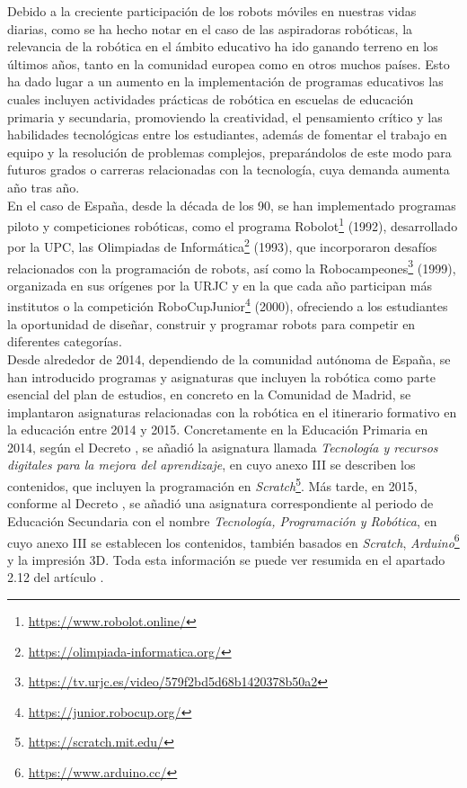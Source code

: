 Debido a la creciente participación de los robots móviles en nuestras vidas
diarias, como se ha hecho notar en el caso de las aspiradoras robóticas, la
relevancia de la robótica en el ámbito educativo ha ido ganando terreno en los
últimos años, tanto en la comunidad europea como en otros muchos países.
Esto ha dado lugar a un aumento en la implementación de programas educativos las
cuales incluyen actividades prácticas de robótica en escuelas de educación
primaria y secundaria, promoviendo la creatividad, el pensamiento crítico y las
habilidades tecnológicas entre los estudiantes, además de fomentar el trabajo en
equipo y la resolución de problemas complejos, preparándolos de este modo para
futuros grados o carreras relacionadas con la tecnología, cuya demanda aumenta
año tras año.
\\

En el caso de España, desde la década de los 90, se han implementado programas
piloto y competiciones robóticas, como el programa Robolot\footnote{
\href{https://www.robolot.online/}{https://www.robolot.online/}} (1992),
desarrollado por la UPC, las Olimpiadas de Informática\footnote{
\href{https://olimpiada-informatica.org/}{https://olimpiada-informatica.org/}}
(1993), que incorporaron desafíos relacionados con la programación de robots,
así como la Robocampeones\footnote{
\href{https://tv.urjc.es/video/579f2bd5d68b1420378b50a2}{https://tv.urjc.es/video/579f2bd5d68b1420378b50a2}}
(1999), organizada en sus orígenes por la URJC y en la que cada año participan
más institutos o la competición RoboCupJunior\footnote{
\href{https://junior.robocup.org/}{https://junior.robocup.org/}} (2000),
ofreciendo a los estudiantes la oportunidad de diseñar, construir y programar
robots para competir en diferentes categorías.
\\

Desde alrededor de 2014, dependiendo de la comunidad autónoma de España, se han
introducido programas y asignaturas que incluyen la robótica como parte esencial
del plan de estudios, en concreto en la Comunidad de Madrid, se implantaron
asignaturas relacionadas con la robótica en el itinerario formativo en la
educación entre 2014 y 2015.
Concretamente en la Educación Primaria en 2014, según el Decreto
\cite{Decreto2014}, se añadió la asignatura llamada \textit{Tecnología y
recursos digitales para la mejora del aprendizaje}, en cuyo anexo III se
describen los contenidos, que incluyen la programación en
\textit{Scratch}\footnote{
\href{https://scratch.mit.edu/}{https://scratch.mit.edu/}}.
Más tarde, en 2015, conforme al Decreto \cite{Decreto2015}, se añadió una
asignatura correspondiente al periodo de Educación Secundaria con el nombre
\textit{Tecnología, Programación y Robótica}, en cuyo anexo III se establecen
los contenidos, también basados en \textit{Scratch}, \textit{Arduino}\footnote{
\href{https://www.arduino.cc/}{https://www.arduino.cc/}} y la impresión 3D.
Toda esta información se puede ver resumida en el apartado 2.12 del artículo
\cite{EducacionRob}.
\\

